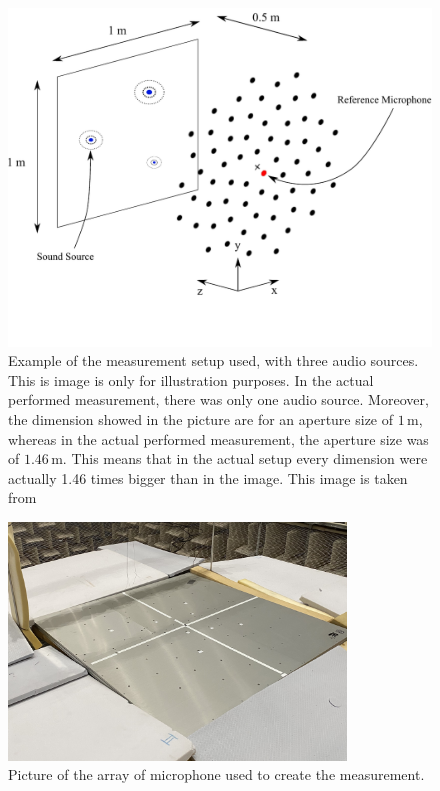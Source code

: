 \documentclass[11pt,a4paper,twoside]{report}
\begin{document}
\begin{figure}
    \centering
    \includegraphics[width=1\textwidth]{figs/full_measurement_setup.pdf}
    \caption{Example of the measurement setup used, with three audio sources. This is image is only for illustration purposes. In the actual performed measurement, there was only one audio source. Moreover, the dimension showed in the picture are for an aperture size of $1\,$m, whereas in the actual performed measurement, the aperture size was of $1.46\,$m. This means that in the actual setup every dimension were actually 1.46 times bigger than in the image. This image is taken from \cite{kujawski2022acoupipe}}
    \label{fig:full_measurement_setup}
\end{figure} 

\begin{figure}
    \centering
    \includegraphics[width=0.8\textwidth]{figs/microphone_array_cropped.jpg}
    \caption{Picture of the array of microphone used to create the measurement.}
    \label{fig:microphone_array}
\end{figure}
\end{document}

